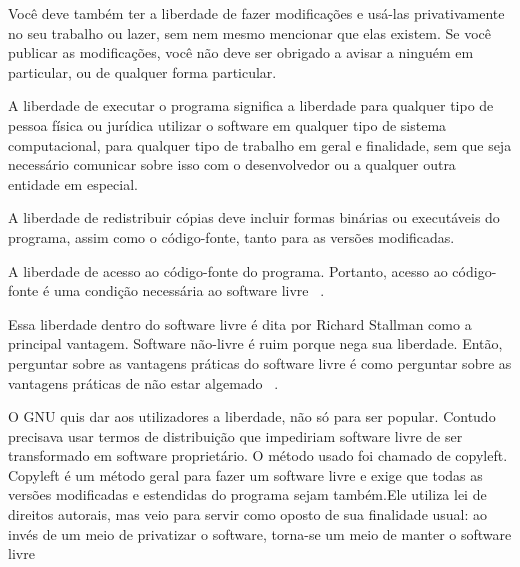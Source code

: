 Você deve também ter a liberdade de fazer modificações e usá-las privativamente no seu trabalho ou lazer, sem nem mesmo mencionar que elas existem. Se você publicar as modificações, você não deve ser obrigado a avisar a ninguém em particular, ou de qualquer forma particular.

A liberdade de executar o programa significa a liberdade para qualquer tipo de pessoa física ou jurídica utilizar o software em qualquer tipo de sistema computacional, para qualquer tipo de trabalho em geral e finalidade, sem que seja necessário comunicar sobre isso com o desenvolvedor ou a qualquer outra entidade em especial.

A liberdade de redistribuir cópias deve incluir formas binárias ou executáveis do programa, assim como o código-fonte, tanto para as versões modificadas.

A liberdade de acesso ao código-fonte do programa. Portanto, acesso ao código-fonte é uma condição necessária ao software livre ~\cite{gnu2013}.

%
Essa liberdade dentro do software livre é dita por Richard Stallman como a principal vantagem. Software não-livre é ruim porque nega sua liberdade. Então, perguntar sobre as vantagens práticas do software livre é como perguntar sobre as vantagens práticas de não estar algemado ~\cite{stallman2009}.

%
O GNU quis dar aos utilizadores a liberdade, não só para ser popular. Contudo precisava usar termos de distribuição que impediriam software livre de ser transformado em software proprietário. O método usado foi chamado de copyleft. Copyleft é um método geral para fazer um software livre e exige que todas as versões modificadas e estendidas do programa sejam também.Ele utiliza lei de direitos autorais, mas veio para servir como oposto de sua finalidade usual: ao invés de um meio de privatizar o software, torna-se um meio de manter o software livre~\cite{stallman2009}

